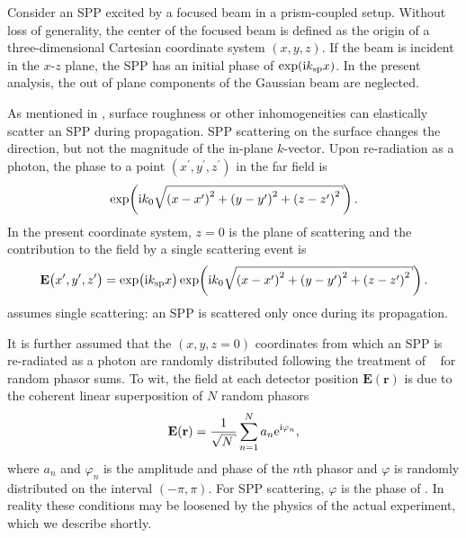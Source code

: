 Consider an SPP excited by a focused beam in a prism-coupled setup.  Without
loss of generality, the center of the focused beam is defined as the origin
of a three-dimensional Cartesian coordinate system $(x,y,z)$.  If the beam is
incident in the $x$-$z$ plane, the SPP has an initial phase of $\exp({\mathrm{i}} k_\mathrm{sp}
x)$.  In the present analysis, the out of plane components of the Gaussian
beam are neglected.

As mentioned in , surface roughness or other
inhomogeneities can elastically scatter an SPP during propagation.  SPP
scattering on the surface changes the direction, but not the magnitude of the
in-plane $k$-vector.  Upon re-radiation as a photon, the phase to a point
$(x^\prime,y^\prime,z^\prime)$ in the far field is 
\begin{equation}
\exp\!\left(\mi k_0 \sqrt{{(x-x^\prime)}^2 + {(y-y^\prime)}^2 + {(z-z^\prime)}^2}\right).
\end{equation}
In the present coordinate system, $z=0$ is the plane of scattering and the
contribution to the field by a single scattering event is
\begin{equation}
\mathbf{E}\big(x^\prime,y^\prime,z^\prime\big)=\exp\!\big( \mi \ksp x \big)
\exp\!\left(\mi k_0 \sqrt{{(x-x^\prime)}^2 + {(y-y^\prime)}^2 + {(z-z^\prime)}^2}\right).
\label{eqn:sppsinglescattering}
\end{equation}
 assumes single scattering: an
SPP is scattered only once during its propagation.

It is further assumed that the $(x,y,z=0)$ coordinates from which an SPP is
re-radiated as a photon are randomly distributed following the treatment of
~\cite{goodman2007speckle} for random phasor sums.  To wit, the
field at each detector position $\mathbf{E}(\mathbf{r})$ is due to the
coherent linear superposition of $N$ random phasors
\begin{equation}
\mathbf{E}(\mathbf{r}) = \frac{1}{\sqrt{N}} \sum_{n=1}^{N} a_n \me^{\mi \varphi_n},
\label{eqn:phasorsum}
\end{equation}
where $a_n$ and $\varphi_n$ is the amplitude and phase of the $n$th phasor 
and $\varphi$ is randomly distributed on the interval $(-\pi,\pi)$.  For 
SPP scattering, $\varphi$ is the phase of .
In reality these conditions may be loosened by the physics of the actual
experiment, which we describe shortly.

